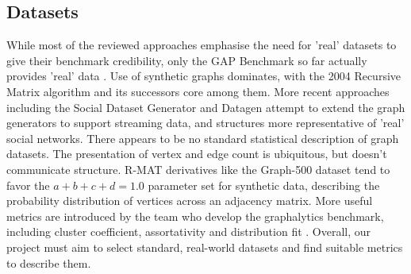 \documentclass[letterpaper, 10pt]{article}
\begin{document}
\begin{multicols}{2}
        \subsection{Datasets}\label{section:datasets}
        \par{While most of the reviewed approaches emphasise the need for 'real' datasets to give their benchmark credibility, only the GAP Benchmark so far actually provides 'real' data \cite{Beamer2017}. 
        Use of synthetic graphs dominates, with the 2004 Recursive Matrix algorithm \cite{Chakrabarti2004} and its successors core among them. 
        More recent approaches including the Social Dataset Generator \cite{Angles2013} and Datagen \cite{Capota2015} attempt to extend the graph generators to support streaming data, and structures more representative of 'real' social networks.
        There appears to be no standard statistical description of graph datasets. 
        The presentation of vertex and edge count is ubiquitous, but doesn't communicate structure. 
        R-MAT derivatives like the Graph-500 dataset \cite{Murphy2010} tend to favor the $a+b+c+d=1.0$} parameter set for synthetic data, describing the probability distribution of vertices across an adjacency matrix.
        More useful metrics are introduced by the team who develop the graphalytics benchmark, including cluster coefficient, assortativity and distribution fit \cite{Capota2015}.
        Overall, our project must aim to select standard, real-world datasets and find suitable metrics to describe them.


\end{multicols}
\end{document}
